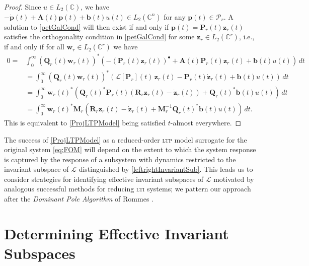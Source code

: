 \documentclass[pdflatex,sn-mathphys-num]{sn-jnl}%
\theoremstyle{thmstyleone}%
\theoremstyle{thmstyletwo}%
\theoremstyle{thmstylethree}%
\begin{document}
\begin{proof} Since $u\in L_2(\mathbb{C})$, 
 we have $-\dot{\mathbf{p}}(t)+\mathbf{A}(t)\mathbf{p}(t)+\mathbf{b}(t)u(t)\in L_2(\mathbb{C}^n)$ for any $\mathbf{p}(t)\in \mathscr{P}_r$.  A solution to \eqref{petGalCond} will then exist if and only if $\mathbf{p}(t)=\mathbf{P}_r(t)\mathbf{z}_r(t)$ satisfies the orthogonality condition in \eqref{petGalCond} for some $\mathbf{z}_r\in L_2(\mathbb{C}^r)$, i.e., if and only if for all $\mathbf{w}_r \in L_2(\mathbb{C}^r)$ we have
    \begin{align*}
0=&\int_0^{\infty}\left(\mathbf{Q}_r(t)\mathbf{w}_r(t)\right)^*\left(-(\mathbf{P}_r(t) \mathbf{z}_r(t))^{\bullet}+\mathbf{A}(t)\mathbf{P}_r(t) \mathbf{z}_r(t)+\mathbf{b}(t)u(t)\right)\,dt \\
&=\int_0^{\infty}\left(\mathbf{Q}_r(t)\mathbf{w}_r(t)\right)^*\left(\mathscr{L}[\mathbf{P}_r](t)\,\mathbf{z}_r(t)-\mathbf{P}_r(t) \dot{\mathbf{z}}_r(t)+\mathbf{b}(t)u(t)\right)\,dt \\
&=\int_0^{\infty}\mathbf{w}_r(t)^*\left(\mathbf{Q}_r(t)^*\mathbf{P}_r(t)\left(\mathbf{R}_r \mathbf{z}_r(t) -\dot{\mathbf{z}}_r(t)\right) +\mathbf{Q}_r(t)^*\mathbf{b}(t)u(t)\right)\,dt \\
&=\int_0^{\infty}\mathbf{w}_r(t)^*\mathbf{M}_r\left(\mathbf{R}_r \mathbf{z}_r(t) -\dot{\mathbf{z}}_r(t) +\mathbf{M}_r^{-1}\mathbf{Q}_r(t)^*\mathbf{b}(t)u(t)\right)\,dt. 
   \end{align*}
   This is equivalent to  \eqref{ProjLTPModel} being satisfied $t$-almost everywhere.
\end{proof}

The success of \eqref{ProjLTPModel} as a reduced-order \textsc{ltp} model surrogate for the original system \eqref{eq:FOM} will depend on the extent to which the system response is captured by the response of a subsystem with dynamics restricted to the invariant subspace of $\mathscr{L}$ distinguished by \eqref{leftrightInvariantSub}.  This leads us to consider strategies for identifying effective invariant subspaces of $\mathscr{L}$ motivated by analogous successful methods for reducing \textsc{lti} systems; we  pattern our approach after the \emph{Dominant Pole Algorithm} of Rommes \cite{rommesDPA}.

\section{Determining Effective Invariant Subspaces
}\label{se:ltp2lti}
\end{document}
